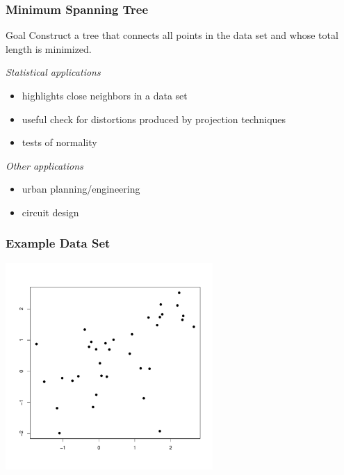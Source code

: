 \documentclass{beamer}
\begin{document}
\begin{frame}
  \frametitle{Minimum Spanning Tree}

\begin{block}{Goal}
Construct a tree that connects all points in the data set and whose total length is minimized.
\end{block}

\emph{Statistical applications}
\begin{itemize}
    \item highlights close neighbors in a data set
    \item useful check for distortions produced by projection techniques
    \item tests of normality
\end{itemize}
\medskip

\emph{Other applications}
\begin{itemize}
    \item urban planning/engineering
    \item circuit design
\end{itemize}

\end{frame}

\begin{frame}
  \frametitle{Example Data Set}

\begin{center}
\includegraphics[height=3.1in]{points-only}
\end{center}
\end{frame}
\end{document}
